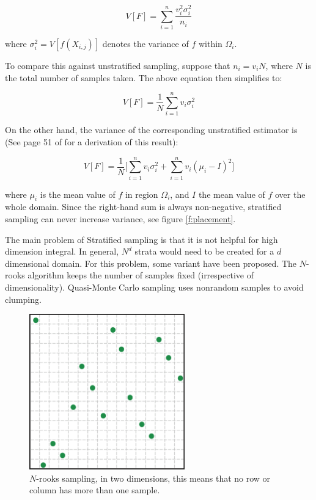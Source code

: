 \begin{equation}
	V[F]=\sum_{i=1}^{n}\frac{v_{i}^2 \sigma_{i}^2}{n_i}
\end{equation}

where $\sigma_{i}^2=V[f(X_{i,j})]$ denotes the variance of $f$ within $\Omega_i$.

To compare this against unstratified sampling, suppose that $n_i=v_iN$, where $N$ is the total number of samples taken. The above equation then simplifies to:

\begin{equation}
	V[F]=\frac{1}{N}\sum_{i=1}^{n}v_{i} \sigma_{i}^2
\end{equation}

On the other hand, the variance of the corresponding unstratified estimator is (See page 51 of \cite[5mm]{a:RobustMonteCarloMethodsforLightTransportSimulation} for a derivation of this result):

\begin{equation}
	V[F]=\frac{1}{N}\Bigg[ \sum_{i=1}^{n}v_{i} \sigma_{i}^2 +\sum_{i=1}^{n}v_i(\mu_i-I)^2   \Bigg]
\end{equation}

where $\mu_i$ is the mean value of $f$ in region $\Omega_i$, and $I$ the mean value of $f$ over the whole domain. Since the right-hand sum is always non-negative, stratified sampling can never increase variance, see figure \ref{f:placement}.

The main problem of Stratified sampling is that it is not helpful for high dimension integral. In general, $N^d$ strata would need to be created for a $d$ dimensional domain. For this problem, some variant have been proposed. The $N$-rooks algorithm keeps the number of samples fixed (irrespective of dimensionality). Quasi-Monte Carlo sampling uses nonrandom samples to avoid clumping.




\begin{figure}
\sidecaption
	\includegraphics[width=0.6\textwidth]{graphics/gi/mc-12-3}
	\caption{$N$-rooks sampling, in two dimensions, this means that no row or column has more than one sample.}
	\label{f:n-rooks}
\end{figure}





